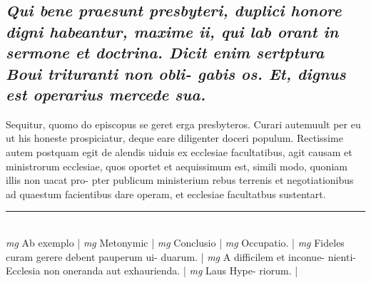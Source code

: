 \documentclass{article}
\begin{document}
\begin{pages}
\subsection*{\textit{Qui bene praesunt presbyteri, duplici honore digni habeantur, maxime ii, qui lab orant in sermone et doctrina. Dicit enim sertptura Boui trituranti non obli- gabis os. Et, dignus est operarius mercede sua. }}\pstart Sequitur, quomo do episcopus se geret erga presbyteros. Curari autemuult per eu ut his honeste prospiciatur, deque eare diligenter doceri populum. Rectissime autem postquam egit de alendis uiduis ex ecclesiae facultatibus, agit causam et ministrorum ecclesiae, quos oportet et aequissimum est, simili modo, quoniam illis non uacat pro- pter publicum ministerium rebus terrenis et negotiationibus ad quaestum facientibus dare operam, et ecclesiae facultatbus sustentart.  \pend
\vspace{0.5cm}\noindent
\vspace{0.2cm}\rule{1cm}{0.2pt}\\ 
\hspace{0.2cm}\textit{mg}
\footnotesize Ab exemplo 
\normalsize| 
\hspace{0.2cm}\textit{mg}
\footnotesize Metonymic 
\normalsize| 
\hspace{0.2cm}\textit{mg}
\footnotesize Conclusio 
\normalsize| 
\hspace{0.2cm}\textit{mg}
\footnotesize Occupatio. 
\normalsize| 
\hspace{0.2cm}\textit{mg}
\footnotesize Fideles curam gerere debent pauperum ui- duarum. 
\normalsize| 
\hspace{0.2cm}\textit{mg}
\footnotesize A difficilem et inconue- nienti- Ecclesia non oneranda aut exhaurienda. 
\normalsize| 
\hspace{0.2cm}\textit{mg}
\footnotesize Laus Hype- riorum. 
\normalsize| 

\end{pages}
\end{document}
